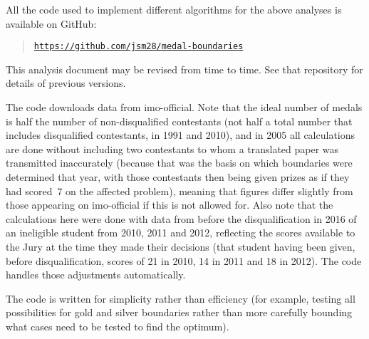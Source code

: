 \documentclass[a4paper,11pt]{article}
\begin{document}
All the code used to implement different algorithms for the above
analyses is available on GitHub:

\begin{quote}
\texttt{\href{https://github.com/jsm28/medal-boundaries}{https://github.com/jsm28/medal-boundaries}}
\end{quote}

This analysis document may be revised from time to time.  See that
repository for details of previous versions.

The code downloads data from imo-official.  Note that the ideal number
of medals is half the number of non-disqualified contestants (not half
a total number that includes disqualified contestants, in 1991 and
2010), and in 2005 all calculations are done without including two
contestants to whom a translated paper was transmitted inaccurately
(because that was the basis on which boundaries were determined that
year, with those contestants then being given prizes as if they had
scored~7 on the affected problem), meaning that figures differ
slightly from those appearing on imo-official if this is not allowed
for.  Also note that the calculations here were done with data from
before the disqualification in 2016 of an ineligible student from
2010, 2011 and 2012, reflecting the scores available to the Jury at
the time they made their decisions (that student having been given,
before disqualification, scores of 21 in 2010, 14 in 2011 and 18 in
2012).  The code handles those adjustments automatically.

The code is written for simplicity rather than efficiency (for
example, testing all possibilities for gold and silver boundaries
rather than more carefully bounding what cases need to be tested to
find the optimum).
\end{document}
